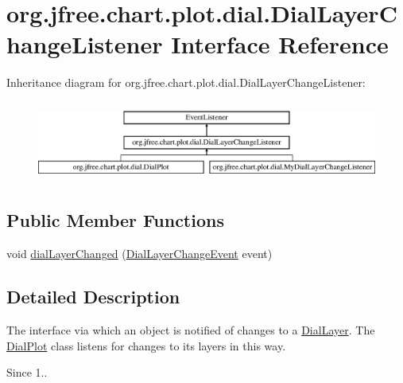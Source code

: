 \hypertarget{interfaceorg_1_1jfree_1_1chart_1_1plot_1_1dial_1_1_dial_layer_change_listener}{}\section{org.\+jfree.\+chart.\+plot.\+dial.\+Dial\+Layer\+Change\+Listener Interface Reference}
\label{interfaceorg_1_1jfree_1_1chart_1_1plot_1_1dial_1_1_dial_layer_change_listener}
Inheritance diagram for org.\+jfree.\+chart.\+plot.\+dial.\+Dial\+Layer\+Change\+Listener\+:\begin{figure}[H]
\begin{center}
\leavevmode
\includegraphics[height=2.658228cm]{interfaceorg_1_1jfree_1_1chart_1_1plot_1_1dial_1_1_dial_layer_change_listener}
\end{center}
\end{figure}
\subsection*{Public Member Functions}
\begin{DoxyCompactItemize}
\item 
void \mbox{\hyperlink{interfaceorg_1_1jfree_1_1chart_1_1plot_1_1dial_1_1_dial_layer_change_listener_ad97d40ca8aa072d975cd285da2b07c75}{dial\+Layer\+Changed}} (\mbox{\hyperlink{classorg_1_1jfree_1_1chart_1_1plot_1_1dial_1_1_dial_layer_change_event}{Dial\+Layer\+Change\+Event}} event)
\end{DoxyCompactItemize}


\subsection{Detailed Description}
The interface via which an object is notified of changes to a \mbox{\hyperlink{interfaceorg_1_1jfree_1_1chart_1_1plot_1_1dial_1_1_dial_layer}{Dial\+Layer}}. The \mbox{\hyperlink{classorg_1_1jfree_1_1chart_1_1plot_1_1dial_1_1_dial_plot}{Dial\+Plot}} class listens for changes to its layers in this way.

\begin{DoxySince}{Since}
1.. 
\end{DoxySince}



